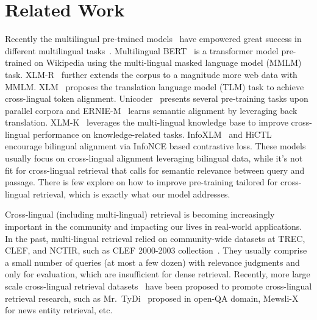 \documentclass{article} %
\newcommand{\tydi}{Mr.~TyDi\xspace}
\newcommand{\news}{Mewsli-X\xspace}
\begin{document}
\section{Related Work}
\label{sec:related}


\label{subsec:mmlm}
Recently the multilingual pre-trained models~\citep{lample2019cross,conneau2019unsupervised, huang2019unicoder} have empowered great success in different multilingual tasks~\citep{liang-etal-2020-xglue, hu2020xtreme}.
Multilingual BERT~\citep{bert2019} is a transformer model pre-trained on Wikipedia using the multi-lingual masked language model (MMLM) task. XLM-R~\citep{conneau2019unsupervised} further extends the corpus to a magnitude more web data with MMLM. XLM~\citep{lample2019cross} proposes the translation language model (TLM) task to achieve cross-lingual token alignment. Unicoder~\citep{huang2019unicoder} presents several pre-training tasks upon parallel corpora and ERNIE-M~\citep{ouyang-etal-2021-ernie} learns semantic alignment by leveraging back translation. XLM-K~\citep{jiang2022xlm} leverages the multi-lingual knowledge base to improve cross-lingual performance on knowledge-related tasks. InfoXLM~\citep{chi-etal-2021-infoxlm} and HiCTL~\citep{wei2020learning} encourage bilingual alignment via InfoNCE based contrastive loss. These models usually focus on cross-lingual alignment leveraging bilingual data, while it's not fit for cross-lingual retrieval that calls for semantic relevance between query and passage. There is few explore on how to improve pre-training tailored for cross-lingual retrieval, which is exactly what our model addresses.


\label{subsec:mdr}
Cross-lingual (including multi-lingual) retrieval is becoming increasingly important in the community and impacting our lives in real-world applications. In the past, multi-lingual retrieval relied on community-wide datasets at TREC, CLEF, and NCTIR, such as CLEF 2000-2003 collection~\citep{ferro2015clef}. They usually comprise a small number of queries (at most a few dozen) with relevance judgments and only for evaluation, which are insufficient for dense retrieval. Recently, more large scale cross-lingual retrieval datasets~\citep{zhang-etal-2021-mr, ruder-etal-2021-xtreme} have been proposed to promote cross-lingual retrieval research, such as \tydi~\citep{asai-etal-2021-xor} proposed in open-QA domain, \news~\citep{ruder-etal-2021-xtreme} for news entity retrieval, etc.
\end{document}
